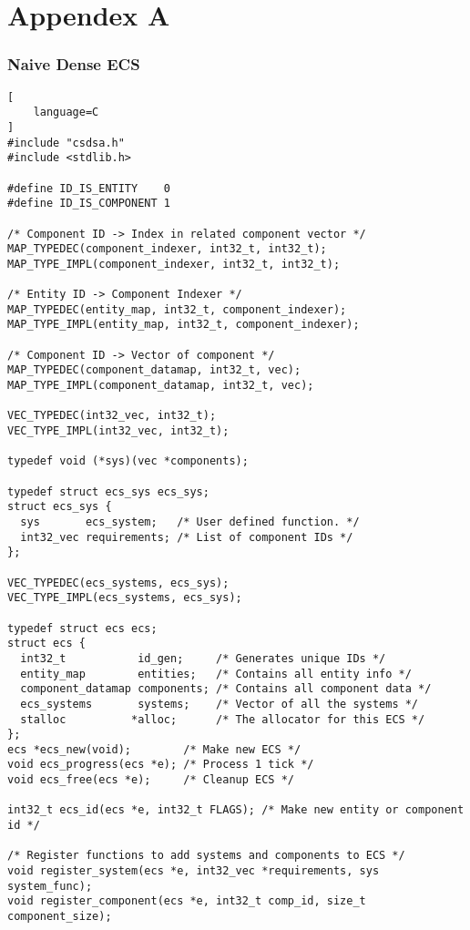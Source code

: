 \section{Appendex A}
\label{appendix:b}

\subsubsection{Naive Dense ECS}
\begin{lstlisting}[
    language=C
]
#include "csdsa.h"
#include <stdlib.h>

#define ID_IS_ENTITY    0
#define ID_IS_COMPONENT 1

/* Component ID -> Index in related component vector */
MAP_TYPEDEC(component_indexer, int32_t, int32_t);
MAP_TYPE_IMPL(component_indexer, int32_t, int32_t);

/* Entity ID -> Component Indexer */
MAP_TYPEDEC(entity_map, int32_t, component_indexer);
MAP_TYPE_IMPL(entity_map, int32_t, component_indexer);

/* Component ID -> Vector of component */
MAP_TYPEDEC(component_datamap, int32_t, vec);
MAP_TYPE_IMPL(component_datamap, int32_t, vec);

VEC_TYPEDEC(int32_vec, int32_t);
VEC_TYPE_IMPL(int32_vec, int32_t);

typedef void (*sys)(vec *components);

typedef struct ecs_sys ecs_sys;
struct ecs_sys {
  sys       ecs_system;   /* User defined function. */
  int32_vec requirements; /* List of component IDs */
};

VEC_TYPEDEC(ecs_systems, ecs_sys);
VEC_TYPE_IMPL(ecs_systems, ecs_sys);

typedef struct ecs ecs;
struct ecs {
  int32_t           id_gen;     /* Generates unique IDs */
  entity_map        entities;   /* Contains all entity info */
  component_datamap components; /* Contains all component data */
  ecs_systems       systems;    /* Vector of all the systems */
  stalloc          *alloc;      /* The allocator for this ECS */
};
ecs *ecs_new(void);        /* Make new ECS */
void ecs_progress(ecs *e); /* Process 1 tick */
void ecs_free(ecs *e);     /* Cleanup ECS */

int32_t ecs_id(ecs *e, int32_t FLAGS); /* Make new entity or component id */

/* Register functions to add systems and components to ECS */
void register_system(ecs *e, int32_vec *requirements, sys system_func);
void register_component(ecs *e, int32_t comp_id, size_t component_size);


\end{lstlisting}
